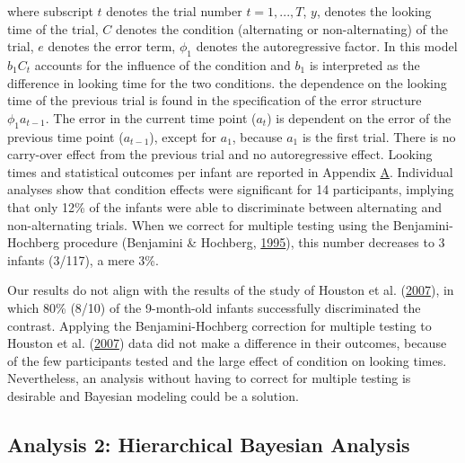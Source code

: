 \documentclass[openright,titlepage,12pt,a4paper]{book}
\begin{document}
where subscript \(t\) denotes the trial number \(t=1,...,T\), \(y\), denotes the looking time of the trial, \(C\) denotes the condition (alternating or non-alternating) of the trial, \(e\) denotes the error term, \(\phi_1\) denotes the autoregressive factor. In this model \(b_1C_t\) accounts for the influence of the condition and \(b_1\) is interpreted as the difference in looking time for the two conditions. the dependence on the looking time of the previous trial is found in the specification of the error structure \(\phi_1a_{t-1}\). The error in the current time point (\(a_t\)) is dependent on the error of the previous time point (\(a_{t-1}\)), except for \(a_1\), because \(a_1\) is the first trial. There is no carry-over effect from the previous trial and no autoregressive effect. Looking times and statistical outcomes per infant are reported in Appendix \protect\hyperlink{ch05appendix}{A}. Individual analyses show that condition effects were significant for 14 participants, implying that only 12\% of the infants were able to discriminate between alternating and non-alternating trials. When we correct for multiple testing using the Benjamini-Hochberg procedure (Benjamini \& Hochberg, \protect\hyperlink{ref-benjamini_controlling_1995}{1995}), this number decreases to 3 infants (3/117), a mere 3\%.

Our results do not align with the results of the study of Houston et al. (\protect\hyperlink{ref-houston_assessing_2007}{2007}), in which 80\% (8/10) of the 9-month-old infants successfully discriminated the contrast. Applying the Benjamini-Hochberg correction for multiple testing to Houston et al. (\protect\hyperlink{ref-houston_assessing_2007}{2007}) data did not make a difference in their outcomes, because of the few participants tested and the large effect of condition on looking times. Nevertheless, an analysis without having to correct for multiple testing is desirable and Bayesian modeling could be a solution.

\hypertarget{analysis-2-hierarchical-bayesian-analysis}{%
\subsection{Analysis 2: Hierarchical Bayesian Analysis}\label{analysis-2-hierarchical-bayesian-analysis}}
\end{document}
